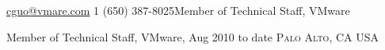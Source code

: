 \documentclass[10pt,letterpaper]{article}
\begin{document}
 



\noindent\href{mailto:cguo@vmware.com}{cguo@vmare.com}\bull
\textsmaller{+}1 (650) 387-8025\bull Member of Technical Staff, VMware

\spacedhrule{0.9em}{-0.4em} %



\headedsection
{Member of Technical Staff, VMware, Aug 2010 to date}
{\textsc{Palo Alto, CA USA}} {

}
\end{document}
